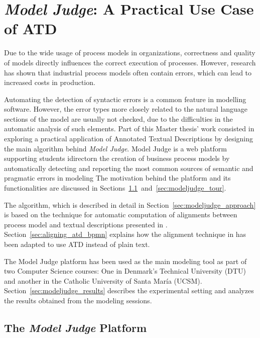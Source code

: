 \chapter{\emph{Model Judge}: A Practical Use Case of ATD}
\label{cha:modeljudge}

Due to the wide usage of process models in organizations, correctness and
quality of models directly influences the correct execution of processes.
However, research has shown that industrial process models often
contain errors, which can lead to increased costs in production.

Automating the detection of syntactic errors is a common feature in 
modelling software. However, the error types more closely related to the
natural language sections of the model are usually not checked, due to the
difficulties in the automatic analysis of such elements. Part of this
Master thesis' work consisted in exploring a practical application of Annotated
Textual Descriptions by designing the main algorithm behind \emph{Model
  Judge}. Model Judge is a web platform supporting
students idirectorn the creation of business process models by automatically detecting
and reporting the most common sources of semantic and pragmatic
errors in modeling The motivation behind the platform and its functionalities
are discussed in
Sections~\ref{sec:modeljudge_description}~and~\ref{sec:modeljudge_tour}.

The algorithm, which is described in detail in
Section~\ref{sec:modeljudge_approach} is based on the technique
for automatic computation of alignments between process model and textual
descriptions presented in \cite{10.1007/978-3-319-59536-8_26}.
Section~\ref{sec:aligning_atd_bpmn} explains how the alignment
technique in \cite{10.1007/978-3-319-59536-8_26} has been adapted to use ATD
instead of plain text.

The Model Judge platform has been used as the main modeling tool as
part of two Computer Science courses: One in Denmark's Technical University
(DTU) and another in the Catholic University of Santa Mar\'ia (UCSM).
Section~\ref{sec:modeljudge_results} describes the experimental setting and
analyzes the results obtained from the modeling sessions.

\section{The \emph{Model Judge} Platform}
\label{sec:modeljudge_description}
 


